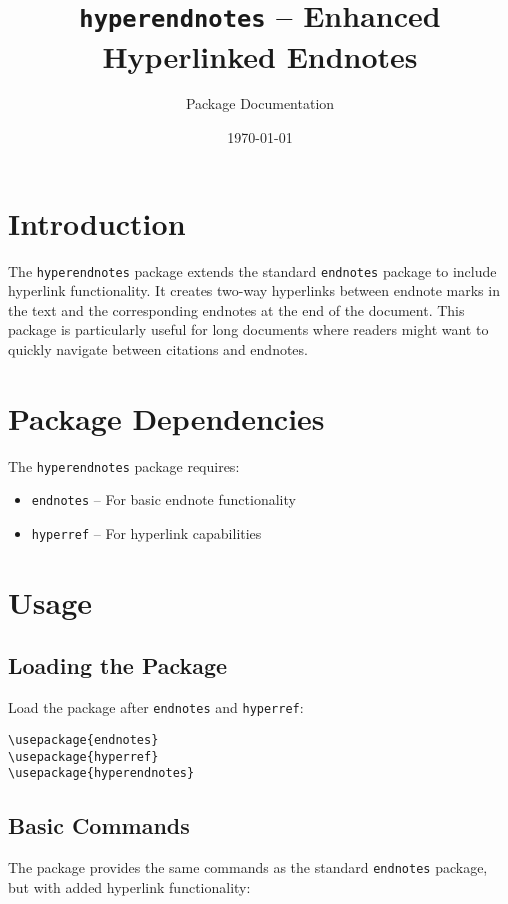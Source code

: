\documentclass[11pt]{article}
\title{\texttt{hyperendnotes} -- Enhanced Hyperlinked Endnotes}
\author{Package Documentation}
\date{\today}
\newcommand{\code}[1]{\texttt{#1}}
\begin{document}
\maketitle

\section{Introduction}

The \code{hyperendnotes} package extends the standard \code{endnotes} package to include hyperlink functionality. It creates two-way hyperlinks between endnote marks in the text and the corresponding endnotes at the end of the document. This package is particularly useful for long documents where readers might want to quickly navigate between citations and endnotes.

\section{Package Dependencies}

The \code{hyperendnotes} package requires:

\begin{itemize}
  \item \code{endnotes} -- For basic endnote functionality
  \item \code{hyperref} -- For hyperlink capabilities
\end{itemize}

\section{Usage}

\subsection{Loading the Package}

Load the package after \code{endnotes} and \code{hyperref}:

\begin{lstlisting}
\usepackage{endnotes}
\usepackage{hyperref}
\usepackage{hyperendnotes}
\end{lstlisting}

\subsection{Basic Commands}

The package provides the same commands as the standard \code{endnotes} package, but with added hyperlink functionality:
\end{document}
